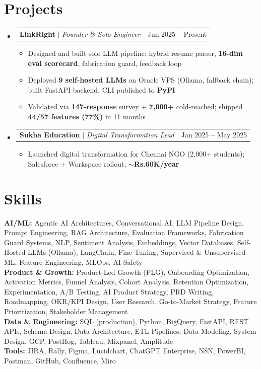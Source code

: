 \documentclass[a4paper,10pt]{article}
\makeatletter
\newcommand{\resumeItem}[1]{
  \item\small{#1\vspace{-2pt}}
}
\newcommand{\resumeProjectHeading}[2]{
  \item
  \begin{tabular*}{0.97\textwidth}{l@{\extracolsep{\fill}}r}
    \small#1 & #2 \\
  \end{tabular*}\vspace{-7pt}
}
\newcommand{\resumeSubHeadingListStart}{\begin{itemize}[leftmargin=0.15in, label={}]}
\newcommand{\resumeSubHeadingListEnd}{\end{itemize}}
\newcommand{\resumeItemListStart}{\begin{itemize}\parfillskip=0pt}
\newcommand{\resumeItemListEnd}{\end{itemize}\vspace{-5pt}}
\makeatother
\begin{document}
\section{Projects}
\resumeSubHeadingListStart

  \resumeProjectHeading
    {\textbf{LinkRight} $|$ \emph{Founder \& Solo Engineer}}{Jun 2025 -- Present}
  \resumeItemListStart
    \resumeItem{Designed and built solo LLM pipeline: hybrid resume parser, \textbf{16-dim eval scorecard}, fabrication guard, feedback loop}
    \resumeItem{Deployed \textbf{9 self-hosted LLMs} on Oracle VPS (Ollama, fallback chain); built FastAPI backend, CLI published to \textbf{PyPI}}
    \resumeItem{Validated via \textbf{147-response} survey + \textbf{7,000+} cold-reached; shipped \textbf{44/57 features (77\%)} in 11 months}
  \resumeItemListEnd

  \resumeProjectHeading
    {\textbf{Sukha Education} $|$ \emph{Digital Transformation Lead}}{Jan 2025 -- May 2025}
  \resumeItemListStart
    \resumeItem{Launched digital transformation for Chennai NGO (2,000+ students); Salesforce + Workspace rollout; \textbf{$\sim$Rs.60K/year}}
  \resumeItemListEnd

\resumeSubHeadingListEnd

\section{Skills}
\begin{itemize}[leftmargin=0.15in, label={}]
  \small{\item{
    \textbf{AI/ML:}{ Agentic AI Architectures, Conversational AI, LLM Pipeline Design, Prompt Engineering, RAG Architecture, Evaluation Frameworks, Fabrication Guard Systems, NLP, Sentiment Analysis, Embeddings, Vector Databases, Self-Hosted LLMs (Ollama), LangChain, Fine-Tuning, Supervised \& Unsupervised ML, Feature Engineering, MLOps, AI Safety} \\
    \textbf{Product \& Growth:}{ Product-Led Growth (PLG), Onboarding Optimization, Activation Metrics, Funnel Analysis, Cohort Analysis, Retention Optimization, Experimentation, A/B Testing, AI Product Strategy, PRD Writing, Roadmapping, OKR/KPI Design, User Research, Go-to-Market Strategy, Feature Prioritization, Stakeholder Management} \\
    \textbf{Data \& Engineering:}{ SQL (production), Python, BigQuery, FastAPI, REST APIs, Schema Design, Data Architecture, ETL Pipelines, Data Modeling, System Design, GCP, PostHog, Tableau, Mixpanel, Amplitude} \\
    \textbf{Tools:}{ JIRA, Rally, Figma, Lucidchart, ChatGPT Enterprise, N8N, PowerBI, Postman, GitHub, Confluence, Miro}
  }}
\end{itemize}
\end{document}
